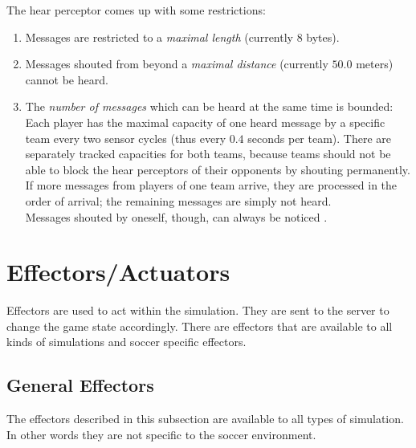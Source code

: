 The hear perceptor comes up with some restrictions:
\begin{enumerate}
	\item Messages are restricted to a \emph{maximal length} (currently 8 bytes).
	\item Messages shouted from beyond a \emph{maximal distance} (currently $50.0$ meters) cannot be heard.
	\item The \emph{number of messages} which can be heard at the same time is
	bounded: Each player has the maximal capacity of one heard message by a
	specific team every two sensor cycles (thus every $0.4$ seconds per team).
	There are separately tracked capacities for both teams, because teams should
	not be able to block the hear perceptors of their opponents by shouting
	permanently. If more messages from players of one team arrive, they are
	processed in the order of arrival; the remaining messages are simply not
	heard.\\ Messages shouted by oneself, though, can always be noticed
	\cite{Vorst06}.
\end{enumerate}


\section{Effectors/Actuators}
\label{sec:effectors}

Effectors are used to act within the simulation. They are sent to the server
to change the game state accordingly. There are effectors that are available to
all kinds of simulations and soccer specific effectors.



\subsection{General Effectors}
\label{sec:generaleffectors}

The effectors described in this subsection are available to all types of
simulation. In other words they are not specific to the soccer environment.

